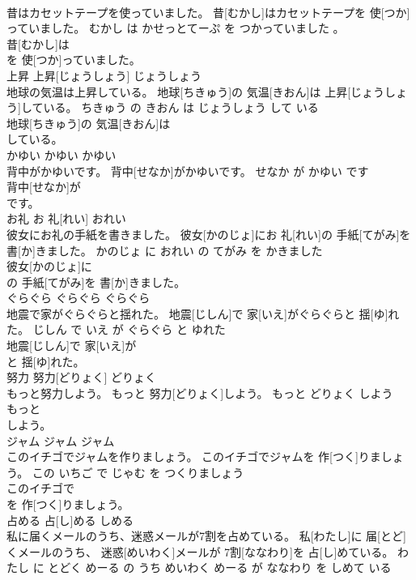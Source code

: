 \documentclass[8pt]{extreport}
\begin{document}
\begin{CJK}{UTF8}{min}
\\	昔はカセットテープを使っていました。	昔[むかし]はカセットテープを 使[つか]っていました。	むかし は かせっとてーぷ を つかっていました 。	
\\	昔[むかし]は
\\	を 使[つか]っていました。			
\\	上昇	上昇[じょうしょう]	じょうしょう	
\\	地球の気温は上昇している。	地球[ちきゅう]の 気温[きおん]は 上昇[じょうしょう]している。	ちきゅう の きおん は じょうしょう して いる	
\\	地球[ちきゅう]の 気温[きおん]は
\\	している。			
\\	かゆい	かゆい	かゆい	
\\	背中がかゆいです。	背中[せなか]がかゆいです。	せなか が かゆい です	
\\	背中[せなか]が
\\	です。			
\\	お礼	お 礼[れい]	おれい	
\\	彼女にお礼の手紙を書きました。	彼女[かのじょ]にお 礼[れい]の 手紙[てがみ]を 書[か]きました。	かのじょ に おれい の てがみ を かきました	
\\	彼女[かのじょ]に
\\	の 手紙[てがみ]を 書[か]きました。			
\\	ぐらぐら	ぐらぐら	ぐらぐら	
\\	地震で家がぐらぐらと揺れた。	地震[じしん]で 家[いえ]がぐらぐらと 揺[ゆ]れた。	じしん で いえ が ぐらぐら と ゆれた	
\\	地震[じしん]で 家[いえ]が
\\	と 揺[ゆ]れた。			
\\	努力	努力[どりょく]	どりょく	
\\	もっと努力しよう。	もっと 努力[どりょく]しよう。	もっと どりょく しよう	
\\	もっと
\\	しよう。			
\\	ジャム	ジャム	ジャム	
\\	このイチゴでジャムを作りましょう。	このイチゴでジャムを 作[つく]りましょう。	この いちご で じゃむ を つくりましょう	
\\	このイチゴで
\\	を 作[つく]りましょう。			
\\	占める	占[し]める	しめる	
\\	私に届くメールのうち、迷惑メールが7割を占めている。	私[わたし]に 届[とど]くメールのうち、 迷惑[めいわく]メールが 7割[ななわり]を 占[し]めている。	わたし に とどく めーる の うち めいわく めーる が ななわり を しめて いる	

\end{CJK}
\end{document}
